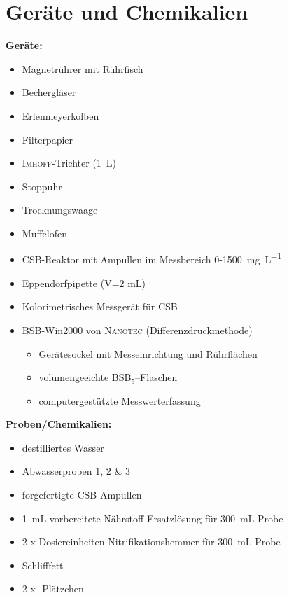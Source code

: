 \chapter{Geräte und Chemikalien}
\label{sec:geraete}

\textbf{Geräte:}
\begin{itemize}
	\item Magnetrührer mit Rührfisch
	\item Bechergläser
	\item Erlenmeyerkolben
	\item Filterpapier
	\item \textsc{Imhoff}-Trichter (\SI{1}{\liter})
	\item Stoppuhr
	\item Trocknungswaage
	\item Muffelofen
	\item CSB-Reaktor mit Ampullen im Messbereich 0-\SI{1500}{\milli\gram\per\liter}
	\item Eppendorfpipette (V=2 mL)
	\item Kolorimetrisches Messgerät für CSB
	\item BSB-Win2000 von \textsc{Nanotec} (Differenzdruckmethode)
		\begin{itemize}
			\item Gerätesockel mit Messeinrichtung und Rührflächen
			\item volumengeeichte BSB$_5$–Flaschen
			\item computergestützte Messwerterfassung 
		\end{itemize}
	
\end{itemize}

\vspace*{5mm}

\textbf{Proben/Chemikalien:}
\begin{itemize}
	\item destilliertes Wasser
	\item Abwasserproben 1, 2 \& 3
	\item forgefertigte CSB-Ampullen
	\item \SI{1}{\milli \liter} vorbereitete Nährstoff-Ersatzlösung für \SI{300}{\milli \liter} Probe
	\item 2 x Dosiereinheiten Nitrifikationshemmer für \SI{300}{\milli \liter} Probe
	\item Schlifffett
	\item 2 x -Plätzchen
\end{itemize}




